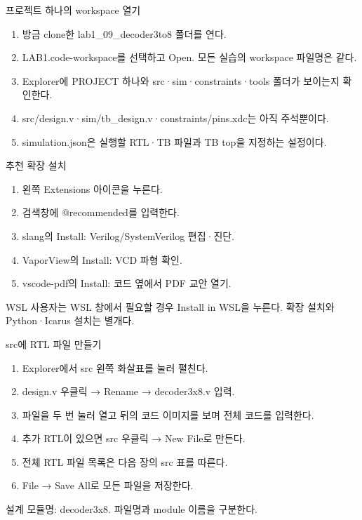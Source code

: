 \begin{frame}{프로젝트 하나의 workspace 열기}\relax
\small
\begin{enumerate}\setlength{\itemsep}{0.22cm}
\item 방금 clone한 lab1\_09\_decoder3to8 폴더를 연다.
\item LAB1.code-workspace를 선택하고 Open. 모든 실습의 workspace 파일명은 같다.
\item Explorer에 PROJECT 하나와 src·sim·constraints·tools 폴더가 보이는지 확인한다.
\item src/design.v·sim/tb\_design.v·constraints/pins.xdc는 아직 주석뿐이다.
\item simulation.json은 실행할 RTL·TB 파일과 TB top을 지정하는 설정이다.
\end{enumerate}

\end{frame}

\begin{frame}{추천 확장 설치}\relax
\small
\begin{enumerate}\setlength{\itemsep}{0.22cm}
\item 왼쪽 Extensions 아이콘을 누른다.
\item 검색창에 @recommended를 입력한다.
\item slang의 Install: Verilog/SystemVerilog 편집·진단.
\item VaporView의 Install: VCD 파형 확인.
\item vscode-pdf의 Install: 코드 옆에서 PDF 교안 열기.
\end{enumerate}
WSL 사용자는 WSL 창에서 필요할 경우 Install in WSL을 누른다. 확장 설치와 Python·Icarus 설치는 별개다.\par
\end{frame}

\begin{frame}{src에 RTL 파일 만들기}\relax
\small
\begin{enumerate}\setlength{\itemsep}{0.22cm}
\item Explorer에서 src 왼쪽 화살표를 눌러 펼친다.
\item design.v 우클릭 → Rename → decoder3x8.v 입력.
\item 파일을 두 번 눌러 열고 뒤의 코드 이미지를 보며 전체 코드를 입력한다.
\item 추가 RTL이 있으면 src 우클릭 → New File로 만든다.
\item 전체 RTL 파일 목록은 다음 장의 src 표를 따른다.
\item File → Save All로 모든 파일을 저장한다.
\end{enumerate}
설계 모듈명: decoder3x8. 파일명과 module 이름을 구분한다.\par
\end{frame}

